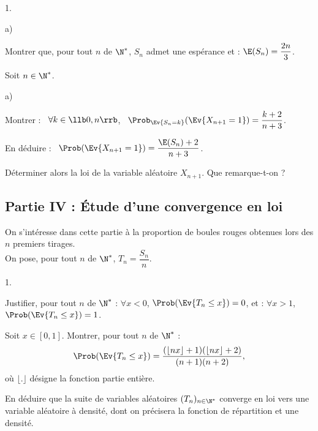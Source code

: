 \begin{noliste}{1.}
\begin{noliste}{a)}
    
  \end{noliste}




\item Montrer que, pour tout $n$ de $\N^*$, $S_n$ admet une espérance
  et : $\E(S_n) = \dfrac{2n}{3}$.

  

\item Soit $n \in \N^*$.
  \begin{noliste}{a)}
  \item Montrer : \ $\forall k \in \llb 0, n \rrb$, \ $\Prob_{\Ev{S_n
        = k}}(\Ev{X_{n+1} = 1}) = \dfrac{k+2}{n+3}$.
    
    
        



  \item En déduire : \ $\Prob(\Ev{X_{n+1} = 1}) = \dfrac{\E(S_n) +
      2}{n+3}$.
      
      

  \item Déterminer alors la loi de la variable aléatoire
    $X_{n+1}$. Que remarque-t-on ?
    
            
  \end{noliste}
\end{noliste}


\newpage


\subsection*{Partie IV : Étude d'une convergence en loi}
\noindent
On s'intéresse dans cette partie à la proportion de boules rouges 
obtenues lors des $n$ premiers tirages.\\[.1cm]
On pose, pour tout $n$ de $\N^*$, $T_n=\dfrac{S_n}{n}$.
\begin{noliste}{1.}
\setcounter{enumi}{10}
\item Justifier, pour tout $n$ de $\N^*$ : $\forall x<0$, 
$\Prob(\Ev{T_n\leq 
x})=0$, et : $\forall x>1$, $\Prob(\Ev{T_n\leq x})=1$.



\item Soit $x\in[0,1]$. Montrer, pour tout $n$ de $\N^*$ :
\[
\Prob(\Ev{T_n\leq x})=\frac{(\lfloor nx\rfloor +1)(\lfloor nx\rfloor 
+2)}{(n+1)(n+2)},
\]
où $\lfloor . \rfloor$ désigne la fonction partie entière.



\item En déduire que la suite de variables aléatoires 
$(T_n)_{n\in\N^*}$ 
converge en loi vers une variable aléatoire à densité, dont on 
précisera 
la fonction de répartition et une densité.


\end{noliste}



